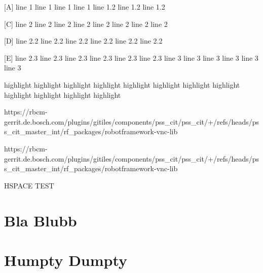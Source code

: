 [A] line 1 line 1 line 1 line 1 \newline
[B] line 1.2 line 1.2 line 1.2

[C] line 2 line 2 line 2 line 2 line 2 line 2 line 2 line 2

\vspace{2ex}

[D] line 2.2 line 2.2 line 2.2 line 2.2 line 2.2 line 2.2

\vspace{1ex}

[E] line 2.3 line 2.3 line 2.3 line 2.3 line 2.3 line 2.3
\newpage
[F] line 3 line 3 line 3 line 3 line 3 line 3


\begin{highlight}
highlight highlight highlight highlight highlight highlight highlight highlight highlight highlight highlight highlight 
\end{highlight}


https://rbcm-gerrit.de.bosch.com/plugins/gitiles/components/pss\_cit/pss\_cit/+/refs/heads/pss\_cit\_master\_int/rf\_packages/robotframework-vnc-lib

\begin{pythoncode}
https://rbcm-gerrit.de.bosch.com/plugins/gitiles/components/pss_cit/pss_cit/+/refs/heads/pss_cit_master_int/rf_packages/robotframework-vnc-lib
\end{pythoncode}


HSPACE TEST


\section{Bla Blubb}


\section{Humpty Dumpty}


